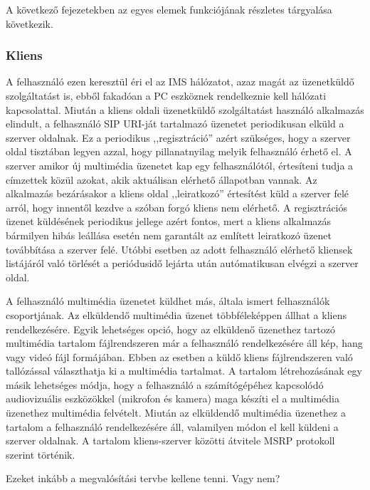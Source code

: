 A következő fejezetekben az egyes elemek funkciójának részletes tárgyalása következik.

\subsubsection{Kliens}
\label{sec:kliens_pc}

A felhasználó ezen keresztül éri el az IMS hálózatot, azaz magát az üzenetküldő szolgáltatást is, ebből fakadóan a PC eszköznek rendelkeznie kell hálózati kapcsolattal. Miután a kliens oldali üzenetküldő szolgáltatást használó alkalmazás elindult, a felhasználó SIP URI-ját tartalmazó üzenetet periodikusan elküld a szerver oldalnak. Ez a periodikus ,,regisztráció'' azért szükséges, hogy a szerver oldal tisztában legyen azzal, hogy pillanatnyilag melyik felhasználó érhető el. A szerver amikor új multimédia üzenetet kap egy felhasználótól, értesíteni tudja a címzettek közül azokat, akik aktuálisan elérhető állapotban vannak. Az alkalmazás bezárásakor a kliens oldal ,,leiratkozó'' értesítést küld a szerver felé arról, hogy innentől kezdve a szóban forgó kliens nem elérhető. A regisztrációs üzenet küldésének periodikus jellege azért fontos, mert a kliens alkalmazás bármilyen hibás leállása esetén nem garantált az említett leiratkozó üzenet továbbítása a szerver felé. Utóbbi esetben az adott felhasználó elérhető kliensek listájáról való törlését a periódusidő lejárta után autómatikusan elvégzi a szerver oldal.

A felhasználó multimédia üzenetet küldhet más, általa ismert felhasználók csoportjának. Az elküldendő multimédia üzenet többféleképpen állhat a kliens rendelkezésére. Egyik lehetséges opció, hogy az elküldenő üzenethez tartozó multimédia tartalom fájlrendszeren már a felhasználó rendelkezésére áll kép, hang vagy videó fájl formájában. Ebben az esetben a küldő kliens fájlrendszeren való tallózással választhatja ki a multimédia tartalmat. A tartalom létrehozásának egy másik lehetséges módja, hogy a felhasználó a számítógépéhez kapcsolódó audiovizuális eszközökkel (mikrofon és kamera) maga készíti el a multimédia üzenethez multimédia felvételt. Miután az elküldendő multimédia üzenethez a tartalom a felhasználó rendelkezésére áll, valamilyen módon el kell küldeni a szerver oldalnak. A tartalom kliens-szerver közötti átvitele MSRP protokoll szerint történik.

{\color{red}Ezeket inkább a megvalósítási tervbe kellene tenni. Vagy nem?}

